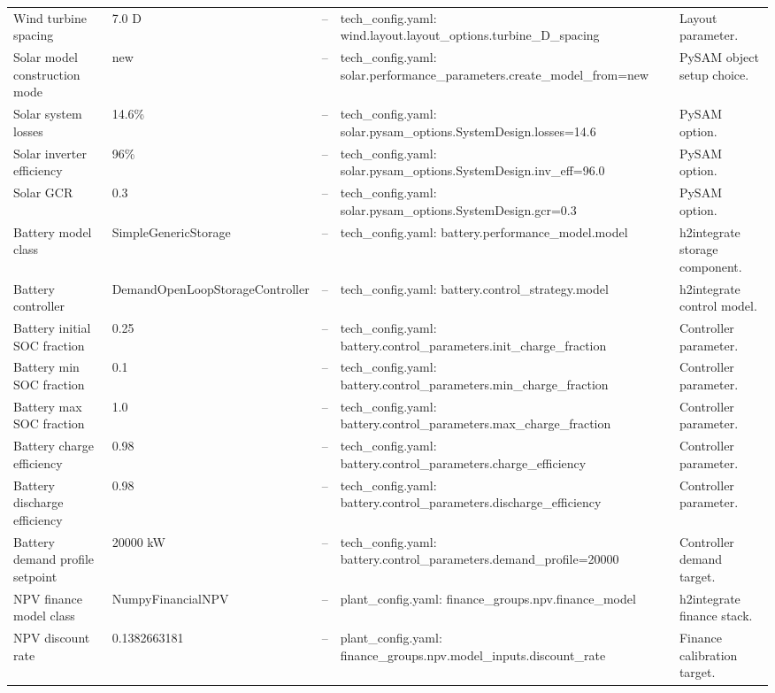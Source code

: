 \begin{center}
\begin{longtable}{p{} p{} p{} p{} p{}}
Wind turbine spacing & 7.0 D & -- & tech\_config.yaml: wind.layout.layout\_options.turbine\_D\_spacing & Layout parameter. \\
Solar model construction mode & new & -- & tech\_config.yaml: solar.performance\_parameters.create\_model\_from=new & PySAM object setup choice. \\
Solar system losses & 14.6\% & -- & tech\_config.yaml: solar.pysam\_options.SystemDesign.losses=14.6 & PySAM option. \\
Solar inverter efficiency & 96\% & -- & tech\_config.yaml: solar.pysam\_options.SystemDesign.inv\_eff=96.0 & PySAM option. \\
Solar GCR & 0.3 & -- & tech\_config.yaml: solar.pysam\_options.SystemDesign.gcr=0.3 & PySAM option. \\
Battery model class & SimpleGenericStorage & -- & tech\_config.yaml: battery.performance\_model.model & h2integrate storage component. \\
Battery controller & DemandOpenLoopStorageController & -- & tech\_config.yaml: battery.control\_strategy.model & h2integrate control model. \\
Battery initial SOC fraction & 0.25 & -- & tech\_config.yaml: battery.control\_parameters.init\_charge\_fraction & Controller parameter. \\
Battery min SOC fraction & 0.1 & -- & tech\_config.yaml: battery.control\_parameters.min\_charge\_fraction & Controller parameter. \\
Battery max SOC fraction & 1.0 & -- & tech\_config.yaml: battery.control\_parameters.max\_charge\_fraction & Controller parameter. \\
Battery charge efficiency & 0.98 & -- & tech\_config.yaml: battery.control\_parameters.charge\_efficiency & Controller parameter. \\
Battery discharge efficiency & 0.98 & -- & tech\_config.yaml: battery.control\_parameters.discharge\_efficiency & Controller parameter. \\
Battery demand profile setpoint & 20000 kW & -- & tech\_config.yaml: battery.control\_parameters.demand\_profile=20000 & Controller demand target. \\
NPV finance model class & NumpyFinancialNPV & -- & plant\_config.yaml: finance\_groups.npv.finance\_model & h2integrate finance stack. \\
NPV discount rate & 0.1382663181 & -- & plant\_config.yaml: finance\_groups.npv.model\_inputs.discount\_rate & Finance calibration target. \\

\end{longtable}
\end{center}
